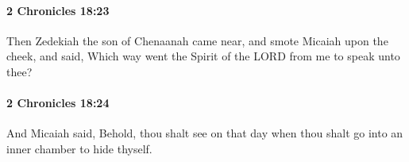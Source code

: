 		\paragraph{2 Chronicles 18:23} %
			\label{2CHRONICLES-18-23}

			Then Zedekiah the son of Chenaanah came near, and smote Micaiah upon the cheek, and said, Which way went the Spirit of the LORD from me to speak unto thee?


		\paragraph{2 Chronicles 18:24} %
			\label{2CHRONICLES-18-24}

			And Micaiah said, Behold, thou shalt see on that day when thou shalt go into an inner chamber to hide thyself.


